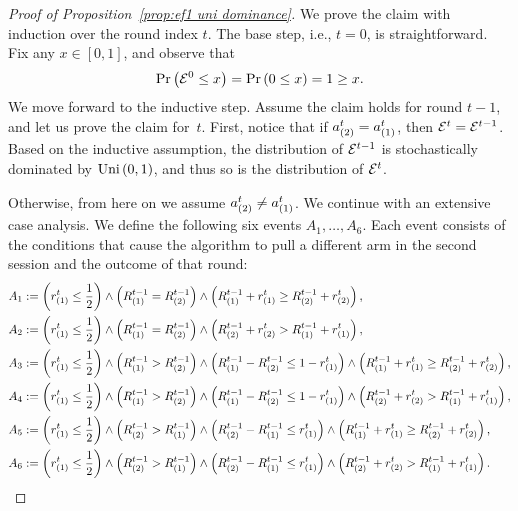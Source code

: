\begin{proof}[Proof of Proposition~\ref{prop:ef1 uni dominance}]
We prove the claim with induction over the round index $t$.
The base step, i.e., $t=0$, is straightforward. Fix any $x\in [0,1]$, and observe that
\[
\Pr\left( \mathcal{E}^0 \leq x \right) = \Pr\left( 0 \leq x \right) = 1 \geq x.
\]
We move forward to the inductive step. Assume the claim holds for round $t-1$, and let us prove the claim for~$t$. First, notice that if $a_{(2)}^t = a_{(1)}^t$, then $\mathcal{E}^t=\mathcal{E}^{t-1}$.
Based on the inductive assumption, the distribution of $\mathcal{E}^{t-1}$ is stochastically dominated by $\text{Uni}\left(0,1\right)$, and thus so is the distribution of $\mathcal{E}^t$.

Otherwise, from here on we assume $a_{(2)}^t \neq a_{(1)}^t$. We continue with an extensive case analysis. We define the following six events $A_1,\dots, A_6$. Each event consists of the conditions that cause the algorithm to pull a different arm in the second session and the outcome of that round:
\begin{align*}
    &A_1 := \left( \rt{(1)} \leq \frac{1}{2} \right) \wedge \left(R^{t-1}_{(1)} = R^{t-1}_{(2)}\right) \wedge  \left( R^{t-1}_{(1)} + \rt{(1)} \geq R^{t-1}_{(2)} + \rt{(2)} \right), \\
    &A_2 := \left( \rt{(1)} \leq \frac{1}{2} \right) \wedge \left(R^{t-1}_{(1)} = R^{t-1}_{(2)}\right) \wedge  \left( R^{t-1}_{(2)} + \rt{(2)} > R^{t-1}_{(1)} + \rt{(1)} \right), \\
    &A_3 := \left( \rt{(1)} \leq \frac{1}{2} \right) \wedge \left(R^{t-1}_{(1)} > R^{t-1}_{(2)} \right) \wedge \left( R^{t-1}_{(1)} - R^{t-1}_{(2)} \leq 1 - \rt{(1)} \right) \wedge \left( R^{t-1}_{(1)} + \rt{(1)} \geq R^{t-1}_{(2)} + \rt{(2)} \right), \\
    &A_4 := \left( \rt{(1)} \leq \frac{1}{2} \right) \wedge \left(R^{t-1}_{(1)} > R^{t-1}_{(2)} \right) \wedge \left( R^{t-1}_{(1)} - R^{t-1}_{(2)} \leq 1 - \rt{(1)} \right) \wedge \left( R^{t-1}_{(2)} + \rt{(2)} > R^{t-1}_{(1)} + \rt{(1)} \right), \\
    &A_5 := \left( \rt{(1)} \leq \frac{1}{2} \right) \wedge \left( R^{t-1}_{(2)} > R^{t-1}_{(1)} \right) \wedge  \left( R^{t-1}_{(2)} - R^{t-1}_{(1)} \leq \rt{(1)} \right) \wedge \left( R^{t-1}_{(1)} + \rt{(1)} \geq R^{t-1}_{(2)} + \rt{(2)} \right), \\
    &A_6 := \left( \rt{(1)} \leq \frac{1}{2} \right) \wedge \left( R^{t-1}_{(2)} > R^{t-1}_{(1)} \right) \wedge  \left( R^{t-1}_{(2)} - R^{t-1}_{(1)} \leq \rt{(1)} \right) \wedge \left( R^{t-1}_{(2)} + \rt{(2)} > R^{t-1}_{(1)} + \rt{(1)} \right).

\end{align*}
\end{proof}
